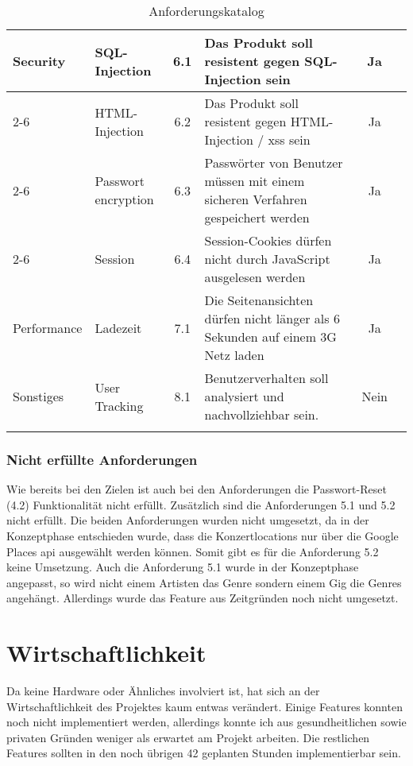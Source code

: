 \begin{longtable}[]{@{}p{1.9cm}p{2.5cm}cp{5.5cm}cc@{}}
  \midrule
  \multirow{9}{*}{Security}       & SQL-Injection              & 6.1          & Das Produkt soll resistent gegen SQL-Injection sein                                                         & Ja                              \\ \cline{2-6}
                                  & HTML-Injection             & 6.2          & Das Produkt soll resistent gegen HTML-Injection / \acrshort{xss} sein                                       & Ja                              \\ \cline{2-6}
                                  & Passwort encryption        & 6.3          & Passwörter von Benutzer müssen mit einem sicheren Verfahren gespeichert werden                              & Ja                              \\ \cline{2-6}
                                  & Session                    & 6.4          & Session-Cookies dürfen nicht durch JavaScript ausgelesen werden                                             & Ja                              \\
  \midrule
  Performance                     & Ladezeit                   & 7.1          & Die Seitenansichten dürfen nicht länger als 6 Sekunden auf einem 3G Netz laden                              & Ja                              \\
  \midrule
  Sonstiges                       & User Tracking              & 8.1          & Benutzerverhalten soll analysiert und nachvollziehbar sein.                                                 & Nein                            \\
  \bottomrule
  \caption{Anforderungskatalog}
\end{longtable}

\clearpage
\subsubsection{Nicht erfüllte Anforderungen}

Wie bereits bei den Zielen ist auch bei den Anforderungen die Passwort-Reset (4.2)
Funktionalität nicht erfüllt.
Zusätzlich sind die Anforderungen 5.1 und 5.2 nicht erfüllt. Die beiden
Anforderungen wurden nicht umgesetzt, da in der Konzeptphase entschieden wurde,
dass die Konzertlocations nur über die Google Places \acrshort{api} ausgewählt werden können.
Somit gibt es für die Anforderung 5.2 keine Umsetzung.
Auch die Anforderung 5.1 wurde in der Konzeptphase angepasst, so wird nicht einem
Artisten das Genre sondern einem Gig die Genres angehängt. Allerdings wurde das
Feature aus Zeitgründen noch nicht umgesetzt.

\section{Wirtschaftlichkeit}

Da keine Hardware oder Ähnliches involviert ist, hat sich an der
Wirtschaftlichkeit des Projektes kaum entwas verändert.
Einige Features konnten noch nicht implementiert werden, allerdings
konnte ich aus gesundheitlichen sowie privaten Gründen weniger als
erwartet am Projekt arbeiten.
Die restlichen Features sollten in den noch übrigen 42 geplanten
Stunden implementierbar sein.
